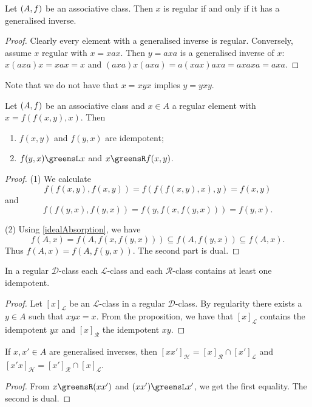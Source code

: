 \begin{proposition}
Let $\left( A, f \right)$ be an associative class. Then $x$ is regular \textup{if and only if} it has a generalised inverse.
\end{proposition}
\begin{proof}
Clearly every element with a generalised inverse is regular. Conversely, assume $x$ regular with $x = xax$. Then $y = axa$ is a generalised inverse of $x$: $x(axa)x = xax = x$ and $(axa)x(axa) = a(xax)axa = axaxa = axa$.
\end{proof}
Note that we do not have that $x = xyx$ implies $y = yxy$.

\begin{proposition} \label{greensRelationsRegularElements}
Let $\left( A, f \right)$ be an associative class and $x\in A$ a regular element with $x = f(f(x, y), x)$. Then
\begin{enumerate}
\item $f(x,y)$ and $f(y,x)$ are idempotent;
\item $f(y,x) \greensL x$ and $x \greensR f(x, y)$.
\end{enumerate}
\end{proposition}
\begin{proof}
(1) We calculate
\[ f(f(x,y), f(x,y)) = f(f(f(x,y), x), y) = f(x, y)\] and \[f(f(y,x), f(y,x)) = f(y, f(x, f(y,x))) = f(y,x). \]

(2) Using \ref{idealAbsorption}, we have
\[ f(A, x) = f(A, f(x,f(y,x))) \subseteq f(A, f(y,x)) \subseteq f(A,x). \]
Thus $f(A, x) = f(A, f(y,x))$. The second part is dual.
\end{proof}
\begin{corollary}
In a regular $\mathcal{D}$-class each $\mathcal{L}$-class and each $\mathcal{R}$-class contains at least one idempotent.
\end{corollary}
\begin{proof}
Let $[x]_\mathcal{L}$ be an $\mathcal{L}$-class in a regular $\mathcal{D}$-class. By regularity there exists a $y\in A$ such that $xyx = x$. From the proposition, we have that $[x]_\mathcal{L}$ contains the idempotent $yx$ and $[x]_\mathcal{R}$ the idempotent $xy$.
\end{proof}
\begin{corollary} \label{idempotentsHclass}
If $x,x'\in A$ are generalised inverses, then $[xx']_\mathcal{H} = [x]_\mathcal{R}\cap [x']_\mathcal{L}$ and $[x'x]_\mathcal{H} = [x']_\mathcal{R}\cap [x]_\mathcal{L}$.
\end{corollary}
\begin{proof}
From $x\greensR (xx')$ and $(xx')\greensL x'$, we get the first equality. The second is dual.
\end{proof}
